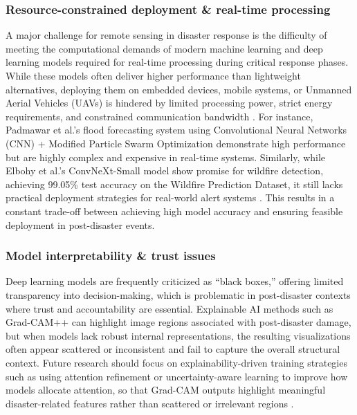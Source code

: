 \documentclass[conference,a4paper]{IEEEtran}
\begin{document}
\subsubsection{\textbf{Resource-constrained deployment \& real-time processing}}
A major challenge for remote sensing in disaster response is the difficulty of meeting the computational demands of modern machine learning and deep learning models required for real-time processing during critical response phases. While these models often deliver higher performance than lightweight alternatives, deploying them on embedded devices, mobile systems, or Unmanned Aerial Vehicles (UAVs) is hindered by limited processing power, strict energy requirements, and constrained communication bandwidth \cite{elbohy2025fusion}. For instance, Padmawar et al.'s flood forecasting system using Convolutional Neural Networks (CNN) + Modified Particle Swarm Optimization demonstrate high performance but are highly complex and expensive in real-time systems. Similarly, while Elbohy et al.'s ConvNeXt-Small model show promise for wildfire detection, achieving 99.05\% test accuracy on the Wildfire Prediction Dataset, it still lacks practical deployment strategies for real-world alert systems \cite{elbohy2025fusion}. This results in a constant trade-off between achieving high model accuracy and ensuring feasible deployment in post-disaster events.

\subsubsection{\textbf{Model interpretability \& trust issues}}
Deep learning models are frequently criticized as ``black boxes,'' offering limited transparency into decision-making, which is problematic in post-disaster contexts where trust and accountability are essential. Explainable AI methods such as Grad-CAM++ can highlight image regions associated with post-disaster damage, but when models lack robust internal representations, the resulting visualizations often appear scattered or inconsistent and fail to capture the overall structural context. Future research should focus on explainability-driven training strategies such as using attention refinement or uncertainty-aware learning to improve how models allocate attention, so that Grad-CAM outputs highlight meaningful disaster-related features rather than scattered or irrelevant regions \cite{lagapEnhancingPostDisasterDamage2025}.
\end{document}
